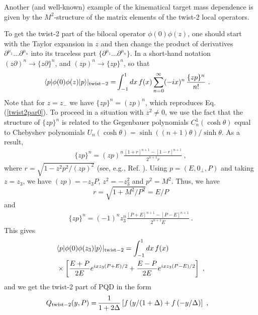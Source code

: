 \documentclass[final,5p,times,twocolumn]{elsarticle}
\begin{document}
Another (and well-known)  example of the kinematical
target mass  dependence  is given by the $M^2$-structure 
of the matrix elements of the twist-2 local operators. 

To get the twist-2 part of the bilocal operator 
$ \phi(0) \phi (z)$,  one should start with the Taylor expansion 
in $z$ and then change the product of derivatives 
$\partial ^{\mu_1} \ldots \partial ^{\mu_n} $
into its traceless part $\{\partial ^{\mu_1} \ldots \partial ^{\mu_n} \}$. 
In a short-hand notation $(z\partial)^n \to \{z \partial \}^n$, and 
$(zp)^n \to \{zp \}^n$, so that 
 \begin{align}
  \langle p |   \phi(0) \phi (z)|p \rangle |_{\rm twist-2} %
=  &\int_{-1}^1 dx \, f(x)   \sum_{n=0}^\infty (-ix)^n \, \frac{\{z p \} ^n}{n!} \  .
\label{tw2sum}
\end{align} 
Note that for $z=z_-$ we have $\{zp \}^n =  (zp)^n$, which  reproduces 
Eq. (\ref{twist2par0}).  To proceed  in a situation with $z^2 \neq 0$, we use the fact that 
the structure of $\{z p \}^n$  is related to  the Gegenbauer polynomials
$C_n^1 (\cosh \theta)$  equal  to  Chebyshev polynomials 
$U_n (\cosh \theta) =\sinh ((n+1) \theta)/\sinh \theta$.  As a result, 
\begin{align} 
\{zp \}^{n}  = (zp)^{n} \frac{ [1+r ]^{n+1} -[1-r ]^{n+1} }{2^{n+1}  r} 
\  ,
\label{zpnR}
\end{align}
where 
$r=\sqrt{1 -z^2 p^2 /(zp)^2} $ (see, e.g., Ref. \cite{Radyushkin:1983mj}).
Using  %
\mbox{$p=(E, 0_\perp, P)$} and taking $z=z_3$,
we have  \mbox{$(zp) = -z_3 P$,}   $z^2= -z_3^2$  and $p^2=M^2$.  Thus,  we have
$$r=   \sqrt{1+ M^2/P^2  } =E /P$$
and 
\begin{align} 
\{zp \}^{n} =   (-1)^n z_3^n  \frac{ [P + E  ]^{n+1} -[P -  E ]^{n+1} }{2^{n+1}  E } 
\  .
\label{zpnR2}
\end{align} 
This gives 
 \begin{align}
 & \langle p |   \phi(0) \phi (z_3)|p \rangle |_{\rm twist-2} %
=  \int_{-1}^1 dx \, f(x)  \nonumber \\ & \times 
 \left [ \frac{E+P}{2E} e^{ ixz_3(P+E)/2} +
  \frac{E-P}{2E} e^{ ixz_3(P-E)/2} \right ] \ ,
\end{align} 
and we get the twist-2 part of PQD in the form 
 \begin{align}
 Q_{\rm twist-2}   (y, P)  = & \,   
  \frac{1}{1+  2 \Delta } \left [ f \left ( y / (1+ {\Delta }\right ) + 
f \left (- y /\Delta  \right )  \right ] 
 \ , 
 \label{newVDFzQin2}
\end{align} 
\end{document}
